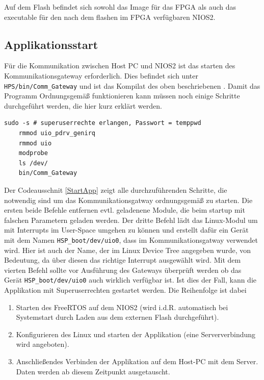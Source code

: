 Auf dem Flash befindet sich sowohl das Image für das \ac{FPGA} als auch das executable für den nach dem flashen im \ac{FPGA} verfügbaren NIOS2. 
\subsection{Applikationsstart}
Für die Kommunikation zwischen Host PC und NIOS2 ist das starten des Kommunikationsgateway erforderlich. Dies befindet sich unter \texttt{HPS/bin/Comm\_Gateway} und ist das Kompilat des oben beschriebenen . Damit das Programm Ordnungsgemäß funktionieren kann müssen noch einige Schritte durchgeführt werden, die hier kurz erklärt werden.

\lstset{language=bash}
\begin{lstlisting}[caption=Listing, label={StartApp}]
	sudo -s # superuserrechte erlangen, Passwort = temppwd
	rmmod uio_pdrv_genirq
	rmmod uio
	modprobe
	ls /dev/
	bin/Comm_Gateway
\end{lstlisting}

Der Codeausschnit \ref{StartApp} zeigt alle durchzuführenden Schritte, die notwendig sind um das Kommunikationsgatway ordnungsgemäß zu starten. Die ersten beide Befehle entfernen evtl. geladenene Module, die beim startup mit falschen Parametern geladen werden. Der dritte Befehl lädt das Linux-Modul um mit Interrupts im User-Space umgehen zu können und erstellt dafür ein Gerät mit dem Namen \texttt{HSP\_boot/dev/uio0}, dass im Kommunikationsgatway verwendet wird. Hier ist auch der Name, der im Linux Device Tree angegeben wurde, von Bedeutung, da über diesen das richtige Interrupt ausgewählt wird. Mit dem vierten Befehl sollte vor Ausführung des Gateways überprüft werden ob das Gerät \texttt{HSP\_boot/dev/uio0} auch wirklich verfügbar ist. Ist dies der Fall, kann die Applikation mit Superuserrechten gestartet werden. Die Reihenfolge ist dabei
\begin{enumerate}
	\item Starten des FreeRTOS auf dem NIOS2 (wird i.d.R. automatisch bei Systemstart durch Laden aus dem externen Flash durchgeführt).
	\item Konfigurieren des Linux und starten der Applikation (eine Serververbindung wird angeboten).
	\item Anschließendes Verbinden der Applikation auf dem Host-PC mit dem Server. Daten werden ab diesem Zeitpunkt ausgetauscht.
\end{enumerate}

